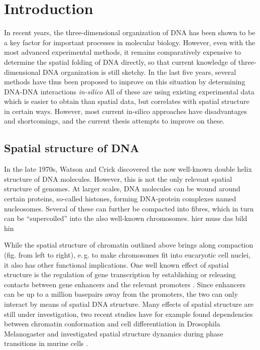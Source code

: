 \section{Introduction}
In recent years, the three-dimensional organization of DNA has been shown to 
be a key factor for important processes in molecular biology.
However, even with the most advanced experimental methods, 
it remains comparatively expensive to determine the spatial folding of DNA directly,
so that current knowledge of three-dimensional DNA organization is still sketchy.
In the last five years, several methods have thus been proposed to improve on this situation
by determining DNA-DNA interactions \emph{in-silico}
All of these are using existing experimental data which is easier to obtain than spatial data, but correlates with spatial structure in certain ways.
However, most current in-silico approaches have disadvantages and shortcomings,
and the current thesis attempts to improve on these.

\subsection{Spatial structure of DNA}
In the late 1970s, Watson and Crick \xxx discovered the now well-known double helix structure of DNA molecules.
However, this is not the only relevant spatial structure of genomes. 
At larger scales, DNA molecules can be wound around certain proteins, so-called histones, forming DNA-protein complexes named nucleosomes.
Several of these can further be compacted into fibres, which in turn can be ``supercoiled'' into the also well-known chromosomes.
\xxx hier muss das bild hin \xxx

While the spatial structure of chromatin outlined above brings along compaction (fig. \xxx from left to right), 
e.\,g. to make chromosomes fit into eucaryotic cell nuclei,
it also has other functional implications.
One well known effect of spatial structure is the regulation of gene transcription by establishing or releasing contacts
between gene enhancers and the relevant promoters \cite{Smallwood2013,Gorkin2014}.
Since enhancers can be up to a million basepairs away from the promoters, 
the two can only interact by means of spatial DNA structure.
Many effects of spatial structure are still under investigation, 
two recent studies have for example found dependencies between chromatin conformation 
and cell differentiation in Drosophila Melanogaster \cite{Chathoth2019}
and investigated spatial structure dynamics during phase transitions in murine cells \cite{Zhang2019b}.

